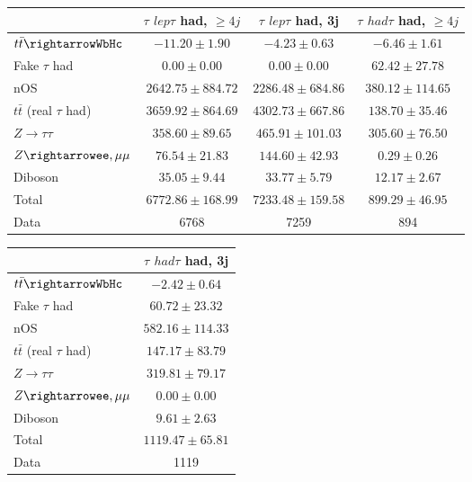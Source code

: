 \begin{table}
\begin{center}
  \begin{tabular}{ | l |  c |  c |  c | }
    \hline \hline 
     &  $\tau$ ${lep}\tau$ {had}, $\geq4j$  &  $\tau$ ${lep}\tau$ {had}, 3j  &  $\tau$ ${had}\tau$ {had}, $\geq4j$  \\ 
    \hline 
     $t\bar{t}\rightarrowWbHc$  &   $ -11.20 \pm 1.90 $ &   $ -4.23 \pm 0.63 $ &   $ -6.46 \pm 1.61 $ \\ 
     Fake $\tau$ {had}  &   $ 0.00 \pm 0.00 $ &   $ 0.00 \pm 0.00 $ &   $ 62.42 \pm 27.78 $ \\ 
    nOS  &   $ 2642.75 \pm 884.72 $ &   $ 2286.48 \pm 684.86 $ &   $ 380.12 \pm 114.65 $ \\ 
     $t\bar{t}$ (real $\tau$ {had})  &   $ 3659.92 \pm 864.69 $ &   $ 4302.73 \pm 667.86 $ &   $ 138.70 \pm 35.46 $ \\ 
     $Z\rightarrow\tau\tau$  &   $ 358.60 \pm 89.65 $ &   $ 465.91 \pm 101.03 $ &   $ 305.60 \pm 76.50 $ \\ 
     $Z\rightarrowee,\mu\mu$  &   $ 76.54 \pm 21.83 $ &   $ 144.60 \pm 42.93 $ &   $ 0.29 \pm 0.26 $ \\ 
    Diboson  &   $ 35.05 \pm 9.44 $ &   $ 33.77 \pm 5.79 $ &   $ 12.17 \pm 2.67 $ \\ 
    Total  &   $ 6772.86 \pm 168.99 $ &   $ 7233.48 \pm 159.58 $ &   $ 899.29 \pm 46.95 $ \\ 
    \hline 
    Data  & 6768  & 7259  & 894  \\ 
    \hline \hline 
  \end{tabular} 


  \begin{tabular}{ | l |  c | }
    \hline \hline 
     &  $\tau$ ${had}\tau$ {had}, 3j  \\ 
    \hline 
     $t\bar{t}\rightarrowWbHc$  &   $ -2.42 \pm 0.64 $ \\ 
     Fake $\tau$ {had}  &   $ 60.72 \pm 23.32 $ \\ 
    nOS  &   $ 582.16 \pm 114.33 $ \\ 
     $t\bar{t}$ (real $\tau$ {had})  &   $ 147.17 \pm 83.79 $ \\ 
     $Z\rightarrow\tau\tau$  &   $ 319.81 \pm 79.17 $ \\ 
     $Z\rightarrowee,\mu\mu$  &   $ 0.00 \pm 0.00 $ \\ 
    Diboson  &   $ 9.61 \pm 2.63 $ \\ 
    Total  &   $ 1119.47 \pm 65.81 $ \\ 
    \hline 
    Data  & 1119  \\ 
    \hline \hline 
  \end{tabular} 


\end{center}
\end{table}
